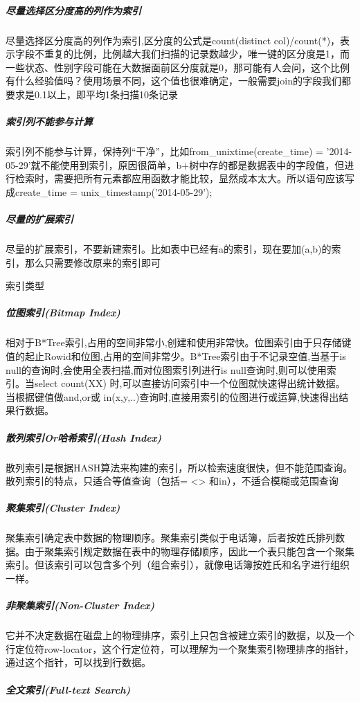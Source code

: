 \documentclass[11pt,fleqn]{book}
\makeatletter
\numberwithin{dummy}{section}
\theoremstyle{ocrenumbox}
\theoremstyle{blacknumex}
\theoremstyle{blacknumbox}
\theoremstyle{ocrenum}
\renewcommand{\subsection}{\@startsection {subsection}{2}{\z@}
	{-3ex \@plus -0.1ex \@minus -.4ex}
	{0.5ex \@plus.2ex }
	{\normalfont\sffamily\bfseries}}
\makeatother
\begin{document}
\subparagraph{尽量选择区分度高的列作为索引}尽量选择区分度高的列作为索引,区分度的公式是count(distinct col)/count(*)，表示字段不重复的比例，比例越大我们扫描的记录数越少，唯一键的区分度是1，而一些状态、性别字段可能在大数据面前区分度就是0，那可能有人会问，这个比例有什么经验值吗？使用场景不同，这个值也很难确定，一般需要join的字段我们都要求是0.1以上，即平均1条扫描10条记录

\subparagraph{索引列不能参与计算}索引列不能参与计算，保持列“干净”，比如from\_unixtime(create\_time) = ’2014-05-29’就不能使用到索引，原因很简单，b+树中存的都是数据表中的字段值，但进行检索时，需要把所有元素都应用函数才能比较，显然成本太大。所以语句应该写成create\_time = unix\_timestamp(’2014-05-29’);

\subparagraph{尽量的扩展索引}尽量的扩展索引，不要新建索引。比如表中已经有a的索引，现在要加(a,b)的索引，那么只需要修改原来的索引即可

\subsection{索引类型}

\subparagraph{位图索引(Bitmap Index)}

相对于B*Tree索引,占用的空间非常小,创建和使用非常快。位图索引由于只存储键值的起止Rowid和位图,占用的空间非常少。B*Tree索引由于不记录空值,当基于is null的查询时,会使用全表扫描,而对位图索引列进行is null查询时,则可以使用索引。当select count(XX) 时,可以直接访问索引中一个位图就快速得出统计数据。当根据键值做and,or或 in(x,y,..)查询时,直接用索引的位图进行或运算,快速得出结果行数据。

\subparagraph{散列索引Or哈希索引(Hash Index)}

散列索引是根据HASH算法来构建的索引，所以检索速度很快，但不能范围查询。散列索引的特点，只适合等值查询（包括= <> 和in），不适合模糊或范围查询

\subparagraph{聚集索引(Cluster Index)}

聚集索引确定表中数据的物理顺序。聚集索引类似于电话簿，后者按姓氏排列数据。由于聚集索引规定数据在表中的物理存储顺序，因此一个表只能包含一个聚集索引。但该索引可以包含多个列（组合索引），就像电话簿按姓氏和名字进行组织一样。 

\subparagraph{非聚集索引(Non-Cluster Index)}

它并不决定数据在磁盘上的物理排序，索引上只包含被建立索引的数据，以及一个行定位符row-locator，这个行定位符，可以理解为一个聚集索引物理排序的指针，通过这个指针，可以找到行数据。

\subparagraph{全文索引(Full-text Search)}
\end{document}
